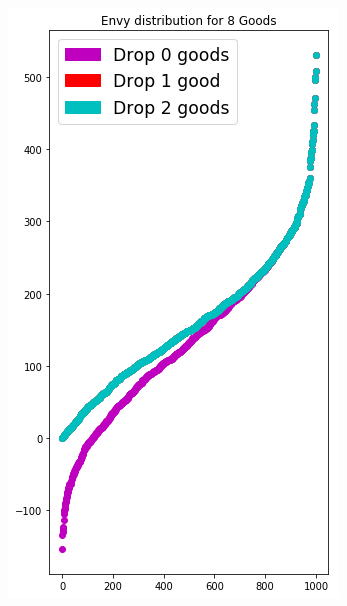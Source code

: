 \begin{figure}[h!]
\begin{subfigure}[b]{0.47\linewidth}
    \includegraphics[width=\linewidth]{images/envy_density/envy_density_us28.png}
    \caption{}
  \end{subfigure}
  \begin{subfigure}[b]{0.47\linewidth}

\end{subfigure}
\end{figure}
